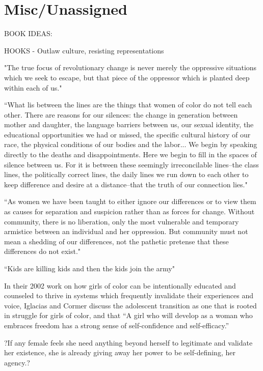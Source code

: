 \documentclass[a4paper, 11pt]{article} %
\begin{document}


\section*{Misc/Unassigned}

BOOK IDEAS:

HOOKS - Outlaw culture, resisting representations

"The true focus of revolutionary change is never merely the oppressive situations which we seek to escape, but that piece of the oppressor which is planted deep within each of us."\cite{lordredefiningdifference} 

``What lis between the lines are the things that women of color do not tell each other. There are reasons for our silences: the change in generation between mother and daughter, the language barriers between us, our sexual identity, the educational opportunities we had or missed, the specific cultural history of our race, the physical conditions of our bodies and the labor... We begin by speaking directly to the deaths and disappointments. Here we begin to fill in the spaces of silence between us. For it is between these seemingly irreconcilable lines--the class lines, the politically correct lines, the daily lines we run down to each other to keep difference and desire at a distance--that the truth of our connection lies."\cite{thebridge}

``As women we have been taught to either ignore our differences or to view them as causes for separation and suspicion rather than as forces for change. Without community, there is no liberation, only the most vulnerable and temporary armistice between an individual and her oppression. But community must not mean a shedding of our differences, not the pathetic pretense that these differences do not exist."\cite{lorde2003master}

``Kids are killing kids and then the kids join the army"\cite{danceordie}

In their 2002 work on how girls of color can be intentionally educated and counseled to thrive in systems which frequently invalidate their experiences and voice, Iglacias and Cormer discuss the adolescent transition as one that is rooted in struggle for girls of color, and that ``A girl who will develop as a woman who embraces freedom has a strong sense of self-confidence and self-efficacy.''\cite{iglesiascormier}

?If any female feels she need anything beyond herself to legitimate and validate her existence, she is already giving away her power to be self-defining, her agency.? \cite{hooksforeveryone}
\end{document}
